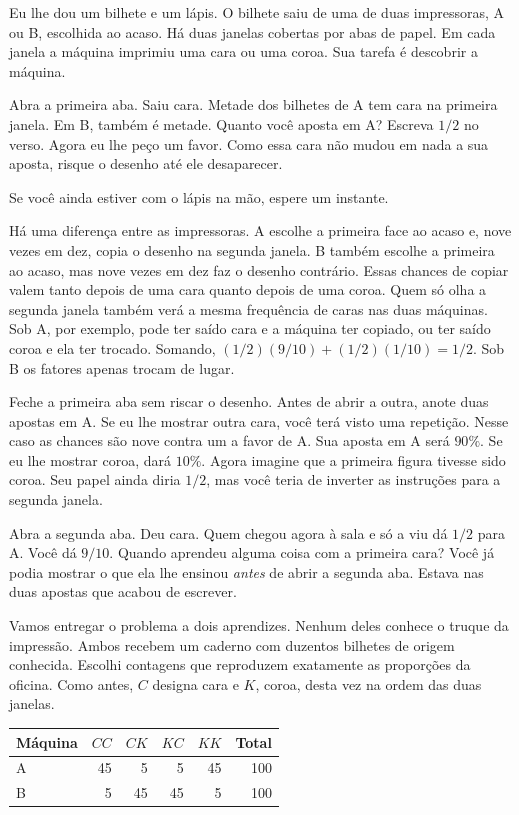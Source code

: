 Eu lhe dou um bilhete e um lápis. O bilhete saiu de uma de duas impressoras, A ou B, escolhida ao acaso. Há duas janelas cobertas por abas de papel. Em cada janela a máquina imprimiu uma cara ou uma coroa. Sua tarefa é descobrir a máquina.

Abra a primeira aba. Saiu cara. Metade dos bilhetes de A tem cara na primeira janela. Em B, também é metade. Quanto você aposta em A? Escreva $1/2$ no verso. Agora eu lhe peço um favor. Como essa cara não mudou em nada a sua aposta, risque o desenho até ele desaparecer.

Se você ainda estiver com o lápis na mão, espere um instante.

Há uma diferença entre as impressoras. A escolhe a primeira face ao acaso e, nove vezes em dez, copia o desenho na segunda janela. B também escolhe a primeira ao acaso, mas nove vezes em dez faz o desenho contrário. Essas chances de copiar valem tanto depois de uma cara quanto depois de uma coroa. Quem só olha a segunda janela também verá a mesma frequência de caras nas duas máquinas. Sob A, por exemplo, pode ter saído cara e a máquina ter copiado, ou ter saído coroa e ela ter trocado. Somando, $(1/2)(9/10)+(1/2)(1/10)=1/2$. Sob B os fatores apenas trocam de lugar.

Feche a primeira aba sem riscar o desenho. Antes de abrir a outra, anote duas apostas em A. Se eu lhe mostrar outra cara, você terá visto uma repetição. Nesse caso as chances são nove contra um a favor de A. Sua aposta em A será $90\%$. Se eu lhe mostrar coroa, dará $10\%$. Agora imagine que a primeira figura tivesse sido coroa. Seu papel ainda diria $1/2$, mas você teria de inverter as instruções para a segunda janela.

Abra a segunda aba. Deu cara. Quem chegou agora à sala e só a viu dá $1/2$ para A. Você dá $9/10$. Quando aprendeu alguma coisa com a primeira cara? Você já podia mostrar o que ela lhe ensinou \emph{antes} de abrir a segunda aba. Estava nas duas apostas que acabou de escrever.

Vamos entregar o problema a dois aprendizes. Nenhum deles conhece o truque da impressão. Ambos recebem um caderno com duzentos bilhetes de origem conhecida. Escolhi contagens que reproduzem exatamente as proporções da oficina. Como antes, $C$ designa cara e $K$, coroa, desta vez na ordem das duas janelas.
\begin{center}
\begin{tabular}{lrrrrr}
\toprule
Máquina & $CC$ & $CK$ & $KC$ & $KK$ & Total \\
\midrule
A & 45 & 5 & 5 & 45 & 100 \\
B & 5 & 45 & 45 & 5 & 100 \\
\bottomrule
\end{tabular}
\end{center}

